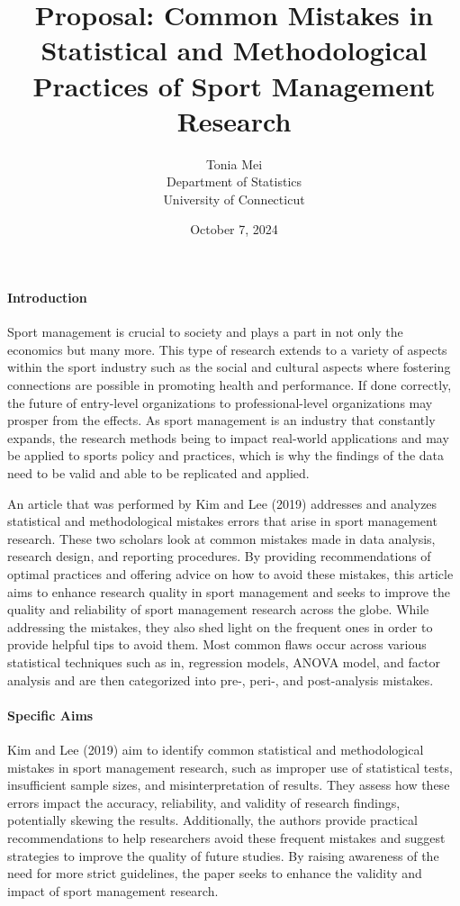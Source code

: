 \documentclass[12pt]{article}
\title{Proposal: Common Mistakes in Statistical and Methodological Practices of Sport Management Research}
\author{Tonia Mei\\
  Department of Statistics\\
  University of Connecticut
}
\date{October 7, 2024}
\begin{document}
\maketitle


\paragraph{Introduction}
Sport management is crucial to society and plays a part in not only the economics but many more. This type of research extends to a variety of aspects within the sport industry such as the social and cultural aspects where fostering connections are possible in promoting health and performance. If done correctly, the future of entry-level organizations to professional-level organizations may prosper from the effects. As sport management is an industry that constantly expands, the research methods being to impact real-world applications and may be applied to sports policy and practices, which is why the findings of the data need to be valid and able to be replicated and applied.

An article that was performed by Kim and Lee (2019) addresses and analyzes statistical and methodological mistakes errors that arise in sport management research. These two scholars look at common mistakes made in data analysis, research design, and reporting procedures. By providing recommendations of optimal practices and offering advice on how to avoid these mistakes, this article aims to enhance research quality in sport management and seeks to improve the quality and reliability of sport management research across the globe. While addressing the mistakes, they also shed light on the frequent ones in order to provide helpful tips to avoid them. Most common flaws occur across various statistical techniques such as in, regression models, ANOVA model, and factor analysis and are then categorized into pre-, peri-, and post-analysis mistakes.


\paragraph{Specific Aims}
Kim and Lee (2019) aim to identify common statistical and methodological mistakes in sport management research, such as improper use of statistical tests, insufficient sample sizes, and misinterpretation of results. They assess how these errors impact the accuracy, reliability, and validity of research findings, potentially skewing the results. Additionally, the authors provide practical recommendations to help researchers avoid these frequent mistakes and suggest strategies to improve the quality of future studies. By raising awareness of the need for more strict guidelines, the paper seeks to enhance the validity and impact of sport management research.
\end{document}

